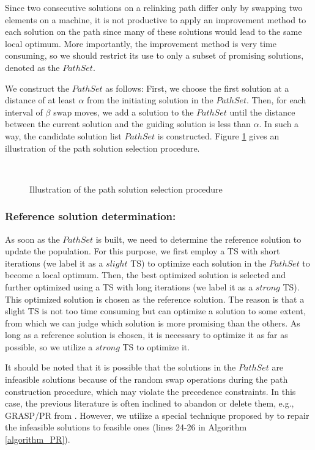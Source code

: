 \documentclass[authoryear,12pt]{elsarticle}
\begin{document}
Since two consecutive solutions on a relinking path differ only by swapping two elements on a machine, it is not productive to apply an improvement method to each solution on the path since many of these solutions would lead to the same local optimum. More importantly, the improvement method is very time consuming, so we should restrict its use to only a subset of promising solutions, denoted as the $PathSet$.

We construct the $PathSet$ as follows: First, we choose the first solution at a distance of at least $\alpha$ from the initiating solution in the $PathSet$. Then, for each interval of $\beta$ swap moves, we add a solution to the $PathSet$ until the distance between the current solution and the guiding solution is less than $\alpha$. In such a way, the candidate solution list $PathSet$ is constructed. Figure \ref{fig_solutionselection} gives an illustration of the path solution selection procedure.

\begin{figure}[!htbp]
  \centering{}\\
  \centering\caption{Illustration of the path solution selection procedure}\label{fig_solutionselection}
\end{figure}

\subsubsection{Reference solution determination:}
\label{subsubsec_ref_solution}

As soon as the $PathSet$ is built, we need to determine the reference solution to update the population. For this purpose, we first employ a TS with short iterations (we label it as a $slight$ TS) to optimize each solution in the $PathSet$ to become a local optimum. Then, the best optimized solution is selected and further optimized using a TS with long iterations (we label it as a $strong$ TS). This optimized solution is chosen as the reference solution. The reason is that a slight TS is not too time consuming but can optimize a solution to some extent, from which we can judge which solution is more promising than the others. As long as a reference solution is chosen, it is necessary to optimize it as far as possible, so we utilize a $strong$ TS to optimize it.

It should be noted that it is possible that the solutions in the $PathSet$ are infeasible solutions because of the random swap operations during the path construction procedure, which may violate the precedence constraints. In this case, the previous literature is often inclined to abandon or delete them, e.g., GRASP/PR from \cite{Aiex2003GRASPwithPR}. However, we utilize a special technique proposed by \cite{Qing-dao-er-ji2012HGA} to repair the infeasible solutions to feasible ones (lines 24-26 in Algorithm \ref{algorithm_PR}).
\end{document}

